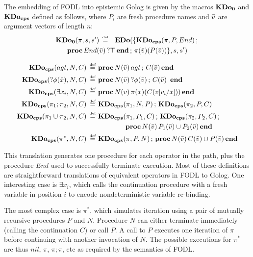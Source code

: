 \begin{defnL}
 The embedding of FODL into
epistemic Golog is given by the macros $\mathbf{KDo_{0}}$ and $\mathbf{KDo_{cps}}$ defined
as follows, where $P_{i}$ are fresh procedure names and $\bar{v}$
are argument vectors of length $n$:\begin{multline*}
\mathbf{KDo_{0}}(\pi,s,s')\,\stackrel{\mbox{\tiny def}}{=}\,\,\ \mathbf{EDo}(\{\mathbf{KDo_{cps}}(\pi,P,End)\,;\,\\
\mathbf{proc}\, End(\bar{v})\,?\top\,\mathbf{end}\,;\,\pi(\bar{v})(P(\bar{v}))\},s,s')\end{multline*}

\end{defnL}
\begin{align*}
\mathbf{KDo_{cps}}(agt,N,C)\,\stackrel{\mbox{\tiny def}}{=}\,\, & \mathbf{proc}\, N(\bar{v})\, agt\,;\, C(\bar{v})\,\mathbf{end}\\
\mathbf{KDo_{cps}}(?\phi(\bar{x}),N,C)\,\stackrel{\mbox{\tiny def}}{=}\,\, & \mathbf{proc}\, N(\bar{v})\,?\phi(\bar{v})\,;\, C(\bar{v})\,\ \mathbf{end}\\
\mathbf{KDo_{cps}}(\exists x_{i},N,C)\,\stackrel{\mbox{\tiny def}}{=}\,\, & \mathbf{proc}\, N(\bar{v})\,\pi(x)(C(\bar{v}[v_{i}/x]))\,\mathbf{end}\\
\mathbf{KDo_{cps}}(\pi_{1};\pi_{2},N,C)\,\stackrel{\mbox{\tiny def}}{=}\,\, & \mathbf{KDo_{cps}}(\pi_{1},N,P)\,;\,\mathbf{KDo_{cps}}(\pi_{2},P,C)\\
\mathbf{KDo_{cps}}(\pi_{1}\cup\pi_{2},N,C)\,\stackrel{\mbox{\tiny def}}{=}\,\, & \mathbf{KDo_{cps}}(\pi_{1},P_{1},C)\,;\,\mathbf{KDo_{cps}}(\pi_{2},P_{2},C)\,;\\
 & \,\mathbf{\,\,\,\,\,\,\,\,\,\,\,\,\,\,\,\,\,\,\,\,\,\,\, proc}\, N(\bar{v})\, P_{1}(\bar{v})\cup P_{2}(\bar{v})\,\mathbf{end}\\
\mathbf{KDo_{cps}}(\pi^{*},N,C)\,\stackrel{\mbox{\tiny def}}{=}\,\, & \mathbf{KDo_{cps}}(\pi,P,N)\,;\,\mathbf{proc}\, N(\bar{v})\, C(\bar{v})\cup P(\bar{v})\,\mathbf{end}\end{align*}


This translation generates one procedure for each operator in the
path, plus the procedure $End$ used to successfully terminate execution.
Most of these definitions are straightforward translations of equivalent
operators in FODL to Golog. One interesting case is $\exists x_{i}$,
which calls the continuation procedure with a fresh variable in position
$i$ to encode nondeterministic variable re-binding.

The most complex case is $\pi^{*}$, which simulates iteration using
a pair of mutually recursive procedures $P$ and $N$. Procedure $N$
can either terminate immediately (calling the continuation $C$) or
call $P$. A call to $P$ executes one iteration of $\pi$ before
continuing with another invocation of $N$. The possible executions
for $\pi^{*}$ are thus $nil$, $\pi$, $\pi;\pi$, etc as required
by the semantics of FODL.

